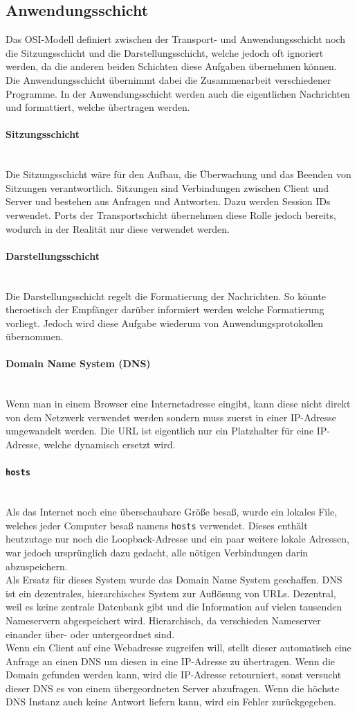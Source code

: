 \documentclass{article}
\newcommand{\paragraphlb}[1]{\paragraph{#1}\mbox{}\\}
\begin{document}
	 \subsection{Anwendungsschicht}
	 Das OSI-Modell definiert zwischen der Transport- und Anwendungsschicht noch die Sitzungsschicht und die Darstellungsschicht, welche jedoch oft ignoriert werden, da die anderen beiden Schichten diese Aufgaben übernehmen können.\\
	 Die Anwendungsschicht übernimmt dabei die Zusammenarbeit verschiedener Programme. In der Anwendungsschicht werden auch die eigentlichen Nachrichten und formattiert, welche übertragen werden.
	 \paragraphlb{Sitzungsschicht}
	 Die Sitzungsschicht wäre für den Aufbau, die Überwachung und das Beenden von Sitzungen verantwortlich. Sitzungen sind Verbindungen zwischen Client und Server und bestehen aus Anfragen und Antworten. Dazu werden Session IDs verwendet. Ports der Transportschicht übernehmen diese Rolle jedoch bereits, wodurch in der Realität nur diese verwendet werden.
	 \paragraphlb{Darstellungsschicht}
	 Die Darstellungsschicht regelt die Formatierung der Nachrichten. So könnte theroetisch der Empfänger darüber informiert werden welche Formatierung vorliegt. Jedoch wird diese Aufgabe wiederum von Anwendungsprotokollen übernommen.
	 \paragraphlb{Domain Name System (DNS)}
	 Wenn man in einem Browser eine Internetadresse eingibt, kann diese nicht direkt von dem Netzwerk verwendet werden sondern muss zuerst in einer IP-Adresse umgewandelt werden. Die URL ist eigentlich nur ein Platzhalter für eine IP-Adresse, welche dynamisch ersetzt wird. \\
	 \cprotect\paragraphlb{\verb|hosts| }
	 Als das Internet noch eine überschaubare Größe besaß, wurde ein lokales File, welches jeder Computer besaß namens \verb|hosts| verwendet. Dieses enthält heutzutage nur noch die Loopback-Adresse und ein paar weitere lokale Adressen, war jedoch ursprünglich dazu gedacht, alle nötigen Verbindungen darin abzuspeichern. \\
	 Als Ersatz für dieses System wurde das Domain Name System geschaffen. DNS ist ein dezentrales, hierarchisches System zur Auflösung von URLs. Dezentral, weil es keine zentrale Datenbank gibt und die Information auf vielen tausenden Nameservern abgespeichert wird. Hierarchisch, da verschieden Nameserver einander über- oder untergeordnet sind. \\
	 Wenn ein Client auf eine Webadresse zugreifen will, stellt dieser automatisch eine Anfrage an einen DNS um diesen in eine IP-Adresse zu übertragen. Wenn die Domain gefunden werden kann, wird die IP-Adresse retourniert, sonst versucht dieser DNS es von einem übergeordneten Server abzufragen. Wenn die höchste DNS Instanz auch keine Antwort liefern kann, wird ein Fehler zurückgegeben. \\
\end{document}
